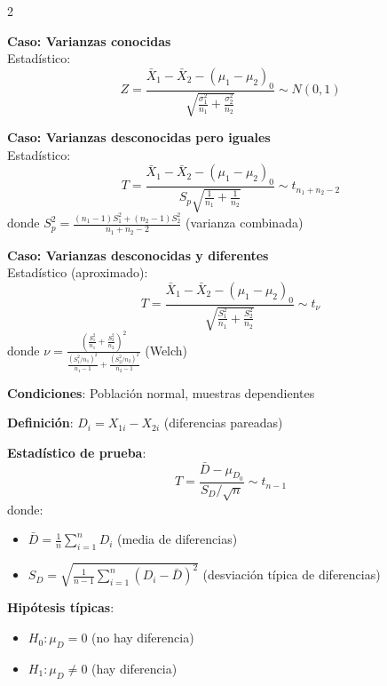 \documentclass[10pt,a4paper]{article}
\begin{document}

\begin{multicols}{2}
    \begin{tcolorbox}[title=Diferencia de Medias (Muestras Independientes), equal height group=CH4]
        \textbf{Caso: Varianzas conocidas} \\
        Estadístico:
        \[
            Z = \frac{\bar{X}_1 - \bar{X}_2 - (\mu_1 - \mu_2)_0}{\sqrt{\frac{\sigma_1^2}{n_1} + \frac{\sigma_2^2}{n_2}}} \sim N(0,1)
        \]
        
        \textbf{Caso: Varianzas desconocidas pero iguales} \\
        Estadístico:
        \[
            T = \frac{\bar{X}_1 - \bar{X}_2 - (\mu_1 - \mu_2)_0}{S_p\sqrt{\frac{1}{n_1} + \frac{1}{n_2}}} \sim t_{n_1+n_2-2}
        \]
        donde $S_p^2 = \frac{(n_1-1)S_1^2 + (n_2-1)S_2^2}{n_1+n_2-2}$ (varianza combinada)
        
        \textbf{Caso: Varianzas desconocidas y diferentes} \\
        Estadístico (aproximado):
        \[
            T = \frac{\bar{X}_1 - \bar{X}_2 - (\mu_1 - \mu_2)_0}{\sqrt{\frac{S_1^2}{n_1} + \frac{S_2^2}{n_2}}} \sim t_\nu
        \]
        donde $\nu = \frac{\left(\frac{S_1^2}{n_1} + \frac{S_2^2}{n_2}\right)^2}{\frac{(S_1^2/n_1)^2}{n_1-1} + \frac{(S_2^2/n_2)^2}{n_2-1}}$ (Welch)
    \end{tcolorbox}
    \begin{tcolorbox}[title=Diferencia de Medias (Muestras Pareadas), equal height group=CH4]
        \textbf{Condiciones}: Población normal, muestras dependientes
        
        \textbf{Definición}: $D_i = X_{1i} - X_{2i}$ (diferencias pareadas)
        
        \textbf{Estadístico de prueba}:
        \[
            T = \frac{\bar{D} - \mu_{D_0}}{S_D/\sqrt{n}} \sim t_{n-1}
        \]
        donde:
        \begin{itemize}
            \item $\bar{D} = \frac{1}{n}\sum_{i=1}^n D_i$ (media de diferencias)
            \item $S_D = \sqrt{\frac{1}{n-1}\sum_{i=1}^n (D_i - \bar{D})^2}$ (desviación típica de diferencias)
        \end{itemize}
        
        \textbf{Hipótesis típicas}:
        \begin{itemize}
            \item $H_0: \mu_D = 0$ (no hay diferencia)
            \item $H_1: \mu_D \neq 0$ (hay diferencia)
        \end{itemize}
    \end{tcolorbox}
\end{multicols}
\end{document}
